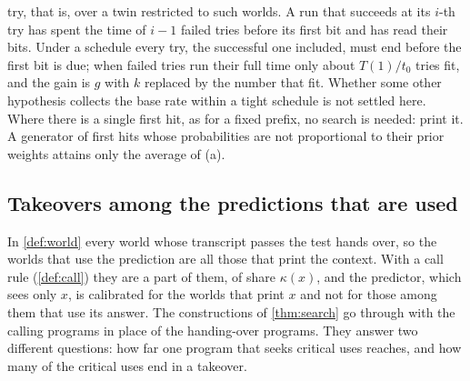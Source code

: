 \begin{itemize}[leftmargin=1.4em,itemsep=1pt,topsep=2pt]
try, that is, over a twin restricted to such worlds. A run that succeeds at its $i$-th
try has spent the time of $i-1$ failed tries before its first bit and has read their bits. Under a schedule
every try, the successful one included, must end before the first bit is due; when failed tries run their
full time only about $T(1)/t_0$ tries fit, and the gain is $g$ with $k$ replaced by the number that fit.
Whether some other hypothesis collects the base rate within a tight schedule is
not settled here. Where there is a single first hit, as for a fixed prefix, no search is needed: print it. A
generator of first hits whose probabilities are not proportional to their prior weights attains only the
average of (a).
\end{itemize}

\subsection{Takeovers among the predictions that are used}\label{sec:critical}

In \cref{def:world} every world whose transcript passes the test hands over, so the worlds that use the
prediction are all those that print the context. With a call rule (\cref{def:call}) they are a part of them,
of share $\kappa(x)$, and the predictor, which sees only $x$, is calibrated for the worlds that print $x$ and
not for those among them that use its answer. The constructions of \cref{thm:search} go through with the
calling programs in place of the handing-over programs. They answer two different questions: how far one
program that seeks critical uses reaches, and how many of the critical uses end in a takeover.

